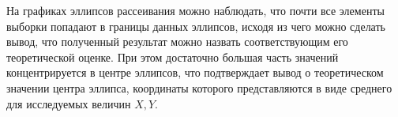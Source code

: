 \documentclass[12pt,a4paper]{article}
\begin{document}
На графиках эллипсов рассеивания можно наблюдать, что почти все элементы выборки попадают в границы данных эллипсов, исходя из чего можно сделать вывод, что полученный результат можно назвать соответствующим его теоретической оценке. При этом достаточно большая часть значений концентрируется в центре эллипсов, что подтверждает вывод о теоретическом значении центра эллипса, координаты которого представляются в виде среднего для исследуемых величин $X,Y$.
\end{document}
